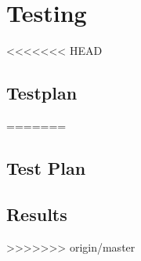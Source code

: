 \chapter{Testing}
\label{chp:testing} 

<<<<<<< HEAD
\section{Testplan}
=======
\section{Test Plan}

\section{Results}
>>>>>>> origin/master
